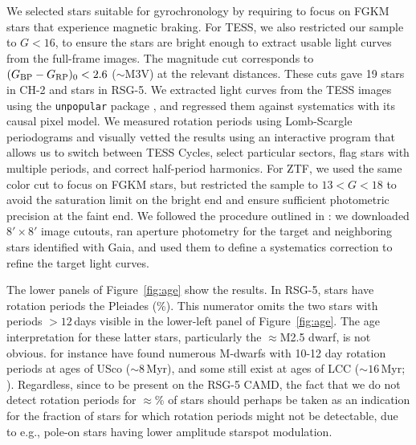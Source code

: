 \documentclass[12pt,twocolumn,tighten,linenumbers]{aastex63}
\newcommand{\bpmrpo}{(G_{\rm BP}-G_{\rm RP})_0}
\begin{document}
We selected stars suitable for gyrochronology by requiring 
\replaced{$\bpmrpo \geq 0.5$}{$\bpmrpo \geq 0.6$} to focus on FGKM stars that experience magnetic
braking.
For TESS, we also restricted our sample to $G<16$, to ensure the stars
are bright enough to extract usable light curves from the full-frame
images.  The magnitude cut corresponds to $\bpmrpo < 2.6$
($\sim$M3V) at the relevant distances.  These cuts gave 19 stars in
CH-2 and  stars in RSG-5.  We extracted light curves from the TESS
images using the \texttt{unpopular} package \citep{hattorio_2021_cpm},
and regressed them against systematics with its causal pixel model.
We measured rotation periods using Lomb-Scargle periodograms and
visually vetted the results using an interactive program that allows
us to switch between TESS Cycles, select particular sectors, flag
stars with multiple periods, and correct half-period harmonics. For
ZTF, we used the same color cut to focus on FGKM stars, but restricted
the sample to $13 < G < 18$ to avoid the saturation limit on the
bright end and ensure sufficient photometric precision at the faint
end. We followed the procedure outlined in \citet{curtis_rup147_2020}:
we downloaded $8'\times8'$ image cutouts, ran aperture photometry for
the target and neighboring stars identified with Gaia, and used them
to define a systematics correction to refine the target light curves. 

The lower panels of Figure~\ref{fig:age} show the results.  In RSG-5,
 stars have rotation periods  the Pleiades (\%).  This
numerator omits the two stars with periods $>$$12$\,days visible in
the lower-left panel of Figure~\ref{fig:age}.  The age interpretation
for these latter stars, particularly the $\approx$M2.5 dwarf, is not
obvious.  \citet{rebull_usco_2018} for instance have found numerous
M-dwarfs with 10-12 day rotation periods at ages of USco
($\sim$$8$\,Myr), and some  still exist at ages of
LCC ($\sim$$16$\,Myr; ).  Regardless, since
 to be present on the RSG-5 CAMD,
the fact
that we do not detect rotation periods for $\approx$\%
of stars should perhaps be taken as an indication for the fraction of
stars for which rotation periods might not be detectable, due to
{e.g.}, pole-on stars having lower amplitude starspot modulation.
\end{document}
